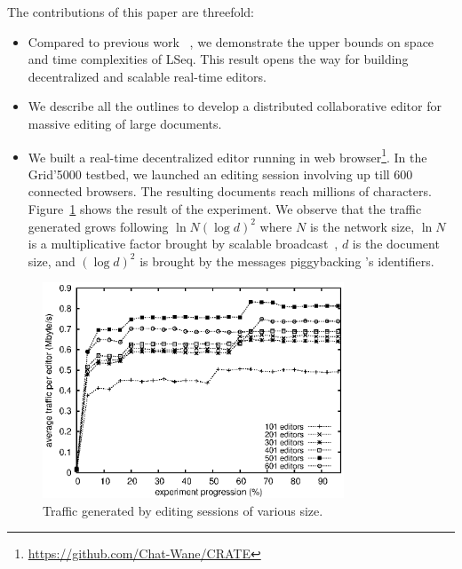 The contributions of  this paper are threefold:
\begin{itemize}
\item Compared to previous work~\cite{nedelec2013concurrency} , we
  demonstrate the upper bounds on space and time complexities of
  LSeq. This result opens the way for building decentralized and
  scalable real-time editors. %
\item We describe all the outlines to develop a distributed
  collaborative editor for massive editing of large documents.
\item We built a real-time decentralized editor running in web
  browser\footnote{\url{https://github.com/Chat-Wane/CRATE}}. In the Grid'5000
  testbed, we launched an editing session involving up till 600 connected
  browsers. The resulting documents reach millions of
  characters. Figure~\ref{fig:traffic} shows the result of the experiment. We
  observe that the traffic generated grows following $\ln N (\log d)^2$ where
  $N$ is the network size, $\ln N$ is a multiplicative factor brought by
  scalable broadcast~\cite{nedelec2015spray}, $d$ is the document size, and $(\log d)^2$ is
  brought by the messages piggybacking \LSEQ's identifiers.
\end{itemize}

\begin{figure}
  \centering
  \includegraphics[width=0.8\textwidth]{img/traffic.eps}
  \caption{\label{fig:traffic} Traffic generated by editing sessions of
    various size.}
\end{figure}

